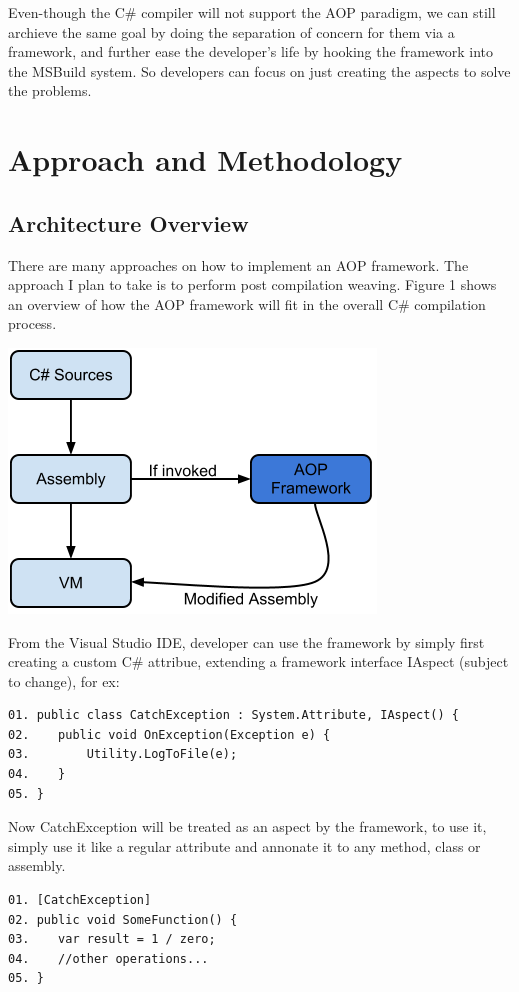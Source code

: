 Even-though the C\# compiler will not support the AOP paradigm, we can still archieve the same goal by doing the separation of concern for them via a framework, and further ease the developer's life by hooking the framework into the MSBuild system. So developers can focus on just creating the aspects to solve the problems.

\section{Approach and Methodology}
\subsection{Architecture Overview}
There are many approaches on how to implement an AOP framework. The approach I plan to take is to perform post compilation weaving. Figure 1 shows an overview of how the AOP framework will fit in the overall C\# compilation process.

\includegraphics[scale=0.70]{model_overview.png}

From the Visual Studio IDE, developer can use the framework by simply first creating a custom C\# attribue, extending a framework interface IAspect (subject to change), for ex:

\begin{verbatim}
01. public class CatchException : System.Attribute, IAspect() {
02.    public void OnException(Exception e) {
03.        Utility.LogToFile(e);
04.    } 
05. }
\end{verbatim}

Now CatchException will be treated as an aspect by the framework, to use it, simply use it like a regular attribute and annonate it to any method, class or assembly.

\begin{verbatim}
01. [CatchException]
02. public void SomeFunction() {
03.    var result = 1 / zero;
04.    //other operations...
05. }
\end{verbatim}

